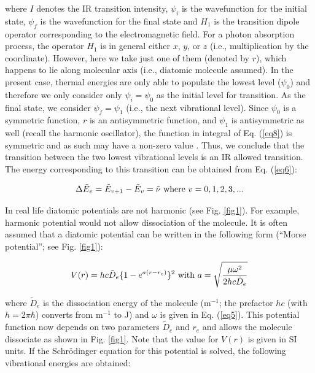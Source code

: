 \documentclass[byrevtex,amssymb,aps,pra,floatfix,letterpaper]{revtex4}
\begin{document}
\noindent
where $I$ denotes the IR transition intensity, $\psi_i$ is the wavefunction for the initial state, $\psi_f$ is the wavefunction for the final state and $H_1$ is the transition dipole operator corresponding to the electromagnetic field. For a photon absorption process, the operator $H_1$ is in general either $x$, $y$, or $z$ (i.e., multiplication by the coordinate). However, here we take just one of them (denoted by $r$), which happens to lie along molecular axis (i.e., diatomic molecule assumed). In the present case, thermal energies are only able to populate the lowest level ($\psi_0$) and therefore we only consider only $\psi_i = \psi_0$ as the initial level for transition. As the final state, we consider $\psi_f = \psi_1$ (i.e., the next vibrational level). Since $\psi_0$ is a symmetric function, $r$ is an antisymmetric function, and $\psi_1$ is antisymmetric as well (recall the harmonic oscillator), the function in integral of Eq. (\ref{eq8}) is symmetric and as such may have a non-zero value \cite{ATKINS1,HERZBERG1}. Thus, we conclude that the transition between the two lowest vibrational levels is an IR allowed transition. The energy corresponding to this transition can be obtained from Eq. (\ref{eq6}):

\begin{equation}
\Delta \tilde{E}_v = \tilde{E}_{v+1} - \tilde{E}_v = \tilde{\nu}\textnormal{ where }v=0,1,2,3,...
\label{eq9}
\end{equation}

In real life diatomic potentials are not harmonic (see Fig. \ref{fig1}). For example, harmonic potential would not allow dissociation of the molecule. It is often assumed that a diatomic potential can be written in the following form (``Morse potential''; see Fig. \ref{fig1}):

\begin{equation}
V(r) = hc\tilde{D}_e\lbrace1 - e^{a\left(r - r_e\right)}\rbrace^2\textnormal{ with }a = \sqrt{\frac{\mu\omega^2}{2hc\tilde{D}_e}}
\label{eq10}
\end{equation}

\noindent
where $\tilde{D}_e$ is the dissociation energy of the molecule (m$^{-1}$; the prefactor $hc$ (with $h = 2\pi\hbar$) converts from m$^{-1}$ to J) and $\omega$ is given in Eq. (\ref{eq5}). This potential function now depends on two parameters $\tilde{D}_e$ and $r_e$ and allows the molecule dissociate as shown in Fig. \ref{fig1}. Note that the value for $V(r)$ is given in SI units. If the Schr\"odinger equation for this potential is solved, the following vibrational energies are obtained:
\end{document}
